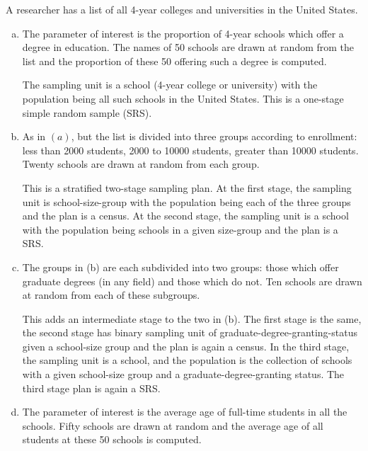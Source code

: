 \documentclass{homework}
\begin{document}
  A researcher has a list of all 4-year colleges and universities in the United States.  
  \begin{enumerate}[(a)]
    \item The parameter of interest is the proportion of 4-year schools which offer a degree in education.  The names of 50 schools are drawn at random from the list and the proportion of these 50 offering such a degree is computed.
    \begin{solution}
      The sampling unit is a school (4-year college or university) with the population being all such schools in the United States.  This is a one-stage simple random sample (SRS).
    \end{solution}
    \item As in $(a)$, but the list is divided into three groups according to enrollment: less than 2000 students, 2000 to 10000 students, greater than 10000 students.  Twenty schools are drawn at random from each group.
    \begin{solution} 
    This is a stratified two-stage sampling plan.  At the first stage, the sampling unit is school-size-group with the population being each of the three groups and the plan is a census.  At the second stage, the sampling unit is a school with the population being schools in a given size-group and the plan is a SRS.
    \end{solution}
    \item The groups in (b) are each subdivided into two groups: those which offer graduate degrees (in any field) and those which do not.  Ten schools are drawn at random from each of these subgroups.
    \begin{solution}
    This adds an intermediate stage to the two in (b).  The first stage is the same, the second stage has binary sampling unit of graduate-degree-granting-status given a school-size group and the plan is again a census.  In the third stage, the sampling unit is a school, and the population is the collection of schools with a given school-size group and a graduate-degree-granting status. The third stage plan is again a SRS.
    \end{solution}
    \item The parameter of interest is the average age of full-time students in all the schools.  Fifty schools are drawn at random and the average age of all students at these 50 schools is computed.
    \begin{solution}

\end{solution}
\end{enumerate}
\end{document}
